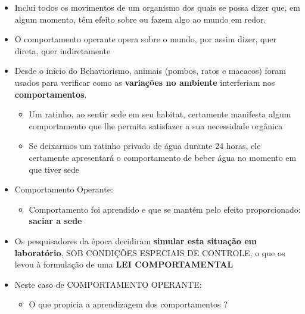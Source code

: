 \documentclass[
]{book}
\providecommand{\tightlist}{%
  \setlength{\itemsep}{0pt}\setlength{\parskip}{0pt}}
\begin{document}
\begin{itemize}
\item
  Inclui todos os movimentos de um organismo dos quais se possa dizer
  que, em algum momento, têm efeito sobre ou fazem algo ao mundo em
  redor.
\item
  O comportamento operante opera sobre o mundo, por assim dizer, quer
  direta, quer indiretamente
\item
  Desde o início do Behaviorismo, animais (pombos, ratos e macacos)
  foram usados para verificar como as \textbf{variações no ambiente}
  interferiam nos \textbf{comportamentos}.

  \begin{itemize}
  \tightlist
  \item
    Um ratinho, ao sentir sede em seu habitat, certamente manifesta
    algum comportamento que lhe permita satisfazer a sua necessidade
    orgânica
  \item
    Se deixarmos um ratinho privado de água durante 24 horas, ele
    certamente apresentará o comportamento de beber água no momento em
    que tiver sede
  \end{itemize}
\item
  Comportamento Operante:

  \begin{itemize}
  \tightlist
  \item
    Comportamento foi aprendido e que se mantém pelo efeito
    proporcionado: \textbf{saciar a sede}
  \end{itemize}
\item
  Os pesquisadores da época decidiram \textbf{simular esta situação em
  laboratório}, SOB CONDIÇÕES ESPECIAIS DE CONTROLE, o que os levou à
  formulação de uma \textbf{LEI COMPORTAMENTAL}
\item
  Neste caso de COMPORTAMENTO OPERANTE:

  \begin{itemize}
  \tightlist
  \item
    O que propicia a aprendizagem dos comportamentos ?


\end{itemize}
\end{itemize}
\end{document}
